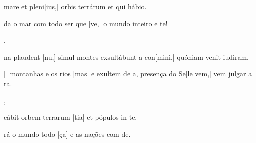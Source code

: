 {  {\item {} mare et pleni[ius,] orbis terrárum et qui hábio.~\Antiphona}%
    {\item {}da o mar com todo ser que [ve,] o mundo inteiro e te!~\Antiphona},
  {\item {}na plaudent [nu,] simul montes exsultábunt a con[mini,] quóniam venit iudiram.~\Antiphona}%
    {\item {}[ ]{mon}tanhas e os rios [mas] e exultem de a,  presença do Se[le vem,] vem julgar a ra.~\Antiphona},
  {\item {}cábit orbem terrarum [tia] et pópulos in \-te.~\Antiphona}%
    {\item {}rá o mundo todo [ça] e as nações com de.~\Antiphona}
}